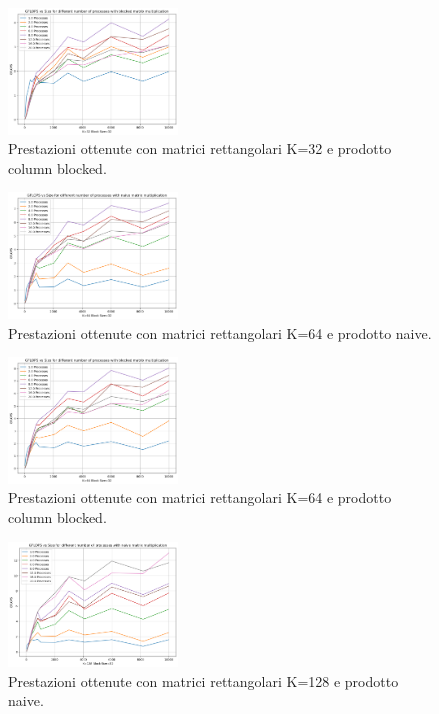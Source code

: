 \documentclass[conference]{IEEEtran}
\begin{document}
\begin{figure}[H]
    \centering
    \includegraphics[width=0.4\textwidth]{resources/rettangolari_k32_blocked.png}
    \caption{Prestazioni ottenute con matrici rettangolari K=32 e prodotto column blocked.}
    \label{fig:rect_k32_matrix_blocked}
\end{figure}
\begin{figure}[H]
    \centering
    \includegraphics[width=0.4\textwidth]{resources/rettangolari_k64_naive.png}
    \caption{Prestazioni ottenute con matrici rettangolari K=64 e prodotto naive.}
    \label{fig:rect_k64_matrix_naive}
\end{figure}
\begin{figure}[H]
    \centering
    \includegraphics[width=0.4\textwidth]{resources/rettangolari_k64_blocked.png}
    \caption{Prestazioni ottenute con matrici rettangolari K=64 e prodotto column blocked.}
    \label{fig:rect_k64_matrix_blocked}
\end{figure}
\begin{figure}[H]
    \centering
    \includegraphics[width=0.4\textwidth]{resources/rettangolari_k128_naive.png}
    \caption{Prestazioni ottenute con matrici rettangolari K=128 e prodotto naive.}
    \label{fig:rect_k128_matrix_naive}
\end{figure}
\end{document}
